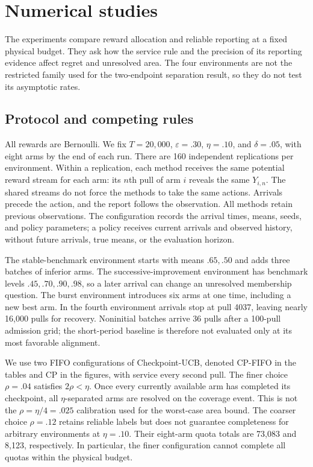 \section{Numerical studies}
\label{sec:experiments}

The experiments compare reward allocation and reliable reporting at a fixed
physical budget. They ask how the service rule and the precision of its
reporting evidence affect regret and unresolved area. The four environments
are not the restricted family used for the two-endpoint separation result,
so they do not test its asymptotic rates.

\subsection{Protocol and competing rules}

All rewards are Bernoulli. We fix $T=20{,}000$, $\varepsilon=.30$,
$\eta=.10$, and $\delta=.05$, with eight arms by the end of each run.
There are 160 independent replications per environment. Within a replication,
each method receives the same potential reward stream for each arm: its
$n$th pull of arm $i$ reveals the same $Y_{i,n}$. The shared streams do not
force the methods to take the same actions. Arrivals precede the action,
and the report follows the observation. All methods retain previous
observations. The configuration records the arrival times, means, seeds,
and policy parameters; a policy receives current arrivals and observed
history, without future arrivals, true means, or the evaluation horizon.

The stable-benchmark environment starts with means $.65,.50$ and adds three
batches of inferior arms. The successive-improvement environment has
benchmark levels $.45,.70,.90,.98$, so a later arrival can change an
unresolved membership question. The burst environment introduces six arms
at one time, including a new best arm. In the fourth environment arrivals
stop at pull 4037, leaving nearly 16,000 pulls for recovery. Noninitial
batches arrive 36 pulls after a 100-pull admission grid; the short-period
baseline is therefore not evaluated only at its most favorable alignment.

We use two FIFO configurations of Checkpoint-UCB, denoted CP-FIFO in the
tables and CP in the figures, with service every second pull. The finer
choice $\rho=.04$ satisfies $2\rho<\eta$. Once every currently available
arm has completed its checkpoint, all $\eta$-separated arms are resolved
on the coverage event. This is not the
$\rho=\eta/4=.025$ calibration used for the worst-case area bound.
The coarser choice $\rho=.12$ retains reliable labels but does not guarantee
completeness for arbitrary environments at $\eta=.10$. Their eight-arm
quota totals are 73,083 and 8,123, respectively. In particular, the finer
configuration cannot complete all quotas within the physical budget.

